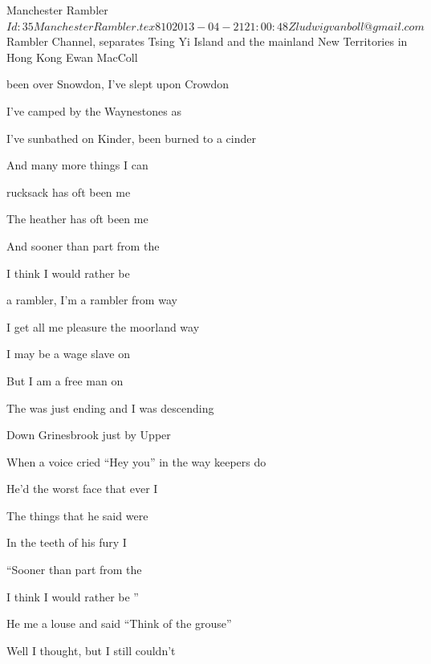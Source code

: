 \begin{SBSong}{Manchester Rambler}
    {$Id: 35ManchesterRambler.tex 810 2013-04-21 21:00:48Z ludwigvanboll@gmail.com $}
    {Rambler Channel, separates Tsing Yi Island and the mainland New Territories in Hong Kong}
    {Ewan MacColl}
  \begin{SBVerse}
	 been over Snowdon, I've slept upon Crowdon
	
	I've camped by the Waynestones as 
	
	I've sunbathed on Kinder, been burned to a cinder
	
	And many more things I can 
	
	 rucksack has oft been me 
	
	The heather has oft been me 
	
	And sooner than part from the 
	
	I think I would rather be  
  \end{SBVerse}
  \begin{SBChorus}
	 a rambler, I'm a rambler from  way
	
	I get all me pleasure the  moorland way
	
	I may be a wage slave on
	
	But I am a free man on  
  \end{SBChorus}
  \begin{SBVerse}
	The  was just ending and I was descending
	
	Down Grinesbrook just by Upper 
	
	When a voice cried ``Hey you'' in the way keepers do
	
	He'd the worst face that ever I 
	
	The things that he said were 
	
	In the teeth of his fury I 
	
	``Sooner than part from the 
	
	I think I would rather be ''
  \end{SBVerse}
  \CBPageBrk
  \begin{SBVerse}
	He  me a louse and said ``Think of the grouse''
	
	Well I thought, but I still couldn't 
	

\end{SBVerse}
\end{SBSong}
